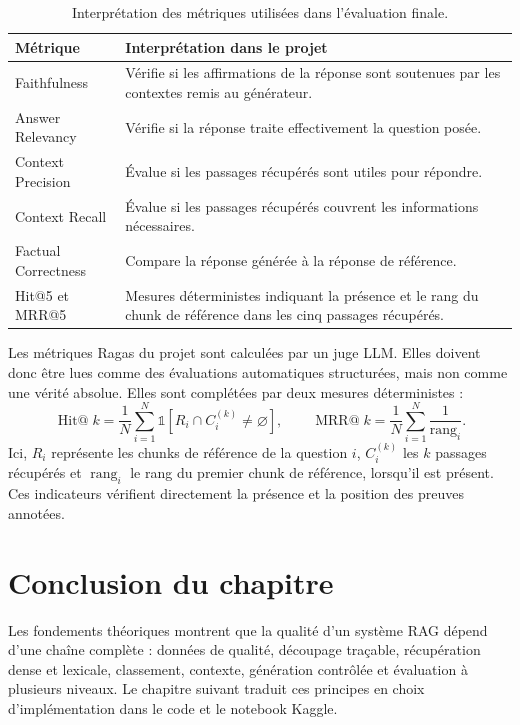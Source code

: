 \documentclass[12pt,a4paper,oneside]{report}
\begin{document}
\begin{table}[H]
\centering
\caption{Interprétation des métriques utilisées dans l'évaluation finale.}
\label{tab:metriques}
\begin{tabularx}{\textwidth}{p{3.4cm}Y}
\toprule
\textbf{Métrique} & \textbf{Interprétation dans le projet}\\
\midrule
Faithfulness & Vérifie si les affirmations de la réponse sont soutenues par les contextes remis au générateur.\\
Answer Relevancy & Vérifie si la réponse traite effectivement la question posée.\\
Context Precision & Évalue si les passages récupérés sont utiles pour répondre.\\
Context Recall & Évalue si les passages récupérés couvrent les informations nécessaires.\\
Factual Correctness & Compare la réponse générée à la réponse de référence.\\
Hit@5 et MRR@5 & Mesures déterministes indiquant la présence et le rang du chunk de référence dans les cinq passages récupérés.\\
\bottomrule
\end{tabularx}
\end{table}

Les métriques Ragas du projet sont calculées par un juge LLM. Elles doivent donc
être lues comme des évaluations automatiques structurées, mais non comme une
vérité absolue. Elles sont complétées par deux mesures déterministes :
\[
\operatorname{Hit@}k=\frac{1}{N}\sum_{i=1}^{N}\mathbb{1}[R_i\cap C_i^{(k)}\neq\varnothing],
\qquad
\operatorname{MRR@}k=\frac{1}{N}\sum_{i=1}^{N}\frac{1}{\operatorname{rang}_i}.
\]
Ici, $R_i$ représente les chunks de référence de la question $i$, $C_i^{(k)}$
les $k$ passages récupérés et $\operatorname{rang}_i$ le rang du premier chunk
de référence, lorsqu'il est présent. Ces indicateurs vérifient directement la
présence et la position des preuves annotées.

\section*{Conclusion du chapitre}

Les fondements théoriques montrent que la qualité d'un système RAG dépend d'une
chaîne complète : données de qualité, découpage traçable, récupération dense et
lexicale, classement, contexte, génération contrôlée et évaluation à plusieurs
niveaux. Le chapitre suivant traduit ces principes en choix d'implémentation dans
le code et le notebook Kaggle.
\end{document}

